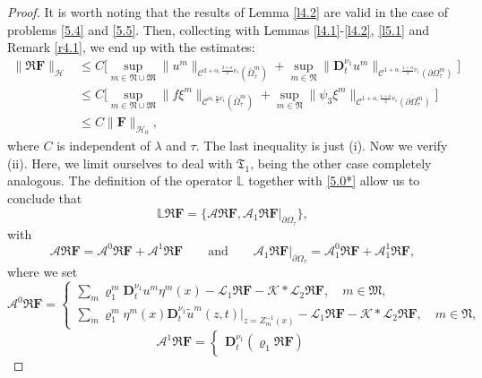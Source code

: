 \documentclass[reqno]{amsart}
\def\C {\mathcal{C}}
\theoremstyle{definition}
\numberwithin{equation}{section}
\begin{document}
\begin{proof}
It is worth noting that the results of Lemma \ref{l4.2} are valid in the case of problems \eqref{5.4} and \eqref{5.5}. Then, collecting  \cite[Proposition 4.4]{KPV1} with Lemmas \ref{l4.1}-\ref{l4.2}, \ref{l5.1} and Remark \ref{r4.1}, we end up with the estimates:
\begin{align*}
\|\mathfrak{R}\mathbf{F}\|_{\mathcal{H}}&\leq C\Big[
\underset{m\in\mathfrak{N}\cup\mathfrak{M}}{\sup}
\|u^{m}\|_{\C^{2+\alpha,\frac{2+\alpha}{2}\nu_{1}}(\bar{\Omega}_{\tau}^{m})}
+
\underset{m\in\mathfrak{N}}{\sup}\|\mathbf{D}_{t}^{\nu_{1}}
u^{m}\|_{\C^{1+\alpha,\frac{1+\alpha}{2}\nu_{1}}(\partial\Omega_{\tau}^{m})}\Big]\\
&
\leq C
\Big[
\underset{m\in\mathfrak{N}\cup\mathfrak{M}}{\sup}\|f\xi^{m}\|_{\C^{\alpha,\frac{\alpha}{2}\nu_{1}}(\bar{\Omega}_{\tau}^{m})}
+
\underset{m\in\mathfrak{N}}{\sup}\|\psi_{3}\xi^{m}\|_{\C^{1+\alpha,\frac{1+\alpha}{2}\nu_{1}}(\partial\Omega_{\tau}^{m})}\Big]\\
&
\leq C\|\mathbf{F}\|_{\mathcal{H}_{0}},
\end{align*}
where  $C$ is independent of $\lambda$ and $\tau$.
The last inequality is just (i).
Now we verify  (ii). Here, we limit ourselves to deal with $\mathfrak{T}_{1}$,
being the other case completely analogous.
The definition of the operator $\mathbb{L}$ together with \eqref{5.0*} allow us to conclude that
\[
\mathbb{L}\mathfrak{R}\mathbf{F}=\{\mathcal{A}\mathfrak{R}\mathbf{F},\mathcal{A}_{1}
\mathfrak{R}\mathbf{F}|_{\partial\Omega_{\tau}}\},
\]
with
\[
\mathcal{A}\mathfrak{R}\mathbf{F}=\mathcal{A}^{0}\mathfrak{R}\mathbf{F}+\mathcal{A}^{1}\mathfrak{R}\mathbf{F}\qquad
\text{and}\qquad\mathcal{A}_{1}\mathfrak{R}\mathbf{F}|_{\partial\Omega_{\tau}}=\mathcal{A}_{1}^{0}\mathfrak{R}\mathbf{F}+
\mathcal{A}_{1}^{1}\mathfrak{R}\mathbf{F},
\]
where we set
\[
\mathcal{A}^{0}\mathfrak{R}\mathbf{F}=\begin{cases}
\sum_{m}\varrho_{1}^{m}\mathbf{D}_{t}^{\nu_{1}}u^{m}\eta^{m}(x)-\mathcal{L}_{1}\mathfrak{R}\mathbf{F}-\mathcal{K}*\mathcal{L}_{2}\mathfrak{R}\mathbf{F},\quad m\in\mathfrak{M},\\
\sum_{m}\varrho_{1}^{m}\eta^{m}(x)\mathbf{D}_{t}^{\nu_{1}}\tilde{u}^{m}(z,t)|_{z=Z_{m}^{-1}(x)}-\mathcal{L}_{1}\mathfrak{R}\mathbf{F}-\mathcal{K}*\mathcal{L}_{2}\mathfrak{R}\mathbf{F},\quad m\in\mathfrak{N},
\end{cases}
\]
\[
\mathcal{A}^{1}\mathfrak{R}\mathbf{F}=\begin{cases}
\mathbf{D}_{t}^{\nu_{1}}(\varrho_{1}\mathfrak{R}\mathbf{F})

\end{cases}\]
\end{proof}
\end{document}
